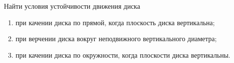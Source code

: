 Найти условия устойчивости движения диска
\begin{enumerate}
	\item при качении диска по прямой, когда плоскость диска вертикальна;
	\item при верчении диска вокруг неподвижного вертикального диаметра;
	\item при качении диска по окружности,
	когда плоскости диска вертикальны.
\end{enumerate}
